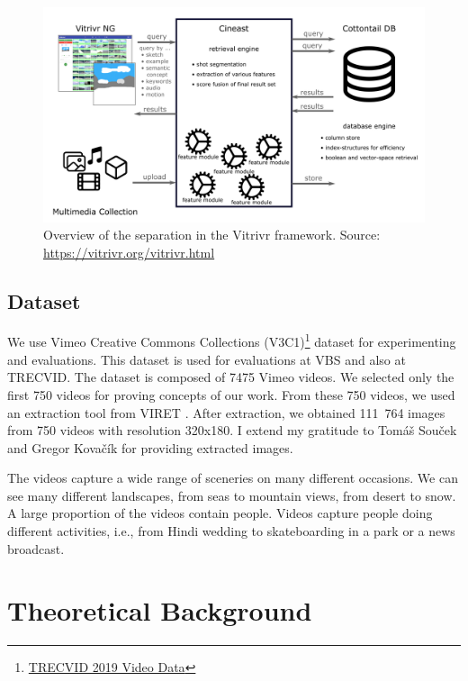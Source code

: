 \begin{figure}
    \centering
    \includegraphics[width=\linewidth]{img/vitrivr.png}
    \caption{Overview of the separation in the Vitrivr framework. Source: \url{https://vitrivr.org/vitrivr.html}}
    \label{fig:vitrivr}
\end{figure}

\section{Dataset}
\label{s:dataset}

We use Vimeo Creative Commons Collections (V3C1)\footnote{\href{https://www-nlpir.nist.gov/projects/tv2019/data.html}{TRECVID 2019 Video Data}} dataset for experimenting and evaluations. This dataset is used for evaluations at VBS and also at TRECVID. The dataset is composed of 7475 Vimeo videos. We selected only the first 750 videos for proving concepts of our work. From these 750 videos, we used an extraction tool from VIRET \cite{lokovc2019framework}. After extraction, we obtained 111\ 764 images from 750 videos with resolution 320x180. I extend my gratitude to Tomáš Souček and Gregor Kovačík for providing extracted images.

The videos capture a wide range of sceneries on many different occasions. We can see many different landscapes, from seas to mountain views, from desert to snow. A large proportion of the videos contain people. Videos capture people doing different activities, i.e., from Hindi wedding to skateboarding in a park or a news broadcast.


\chapter{Theoretical Background}

